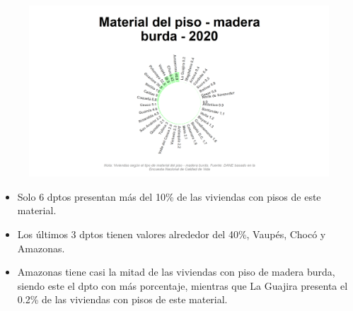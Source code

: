     \begin{figure}[H]
        \caption[Viviendas con piso de madera burda por departamentos para 2020 ]{\label{piso_madera_burda_dptos} }
        \begin{center}
        \includegraphics[width=\textwidth,keepaspectratio]{img/var_175_static.png}
        \end{center}
    \end{figure}
            \begin{itemize}
                    \item Solo 6 dptos presentan más del 10\% de las viviendas con pisos de este material.
                    \item Los últimos 3 dptos tienen valores alrededor del 40\%, Vaupés, Chocó y Amazonas.
                    \item Amazonas tiene casi la mitad de las viviendas con piso de madera burda, siendo este el dpto con más porcentaje, mientras que La Guajira presenta el 0.2\% de las viviendas con pisos de este material.
                    \end{itemize}

